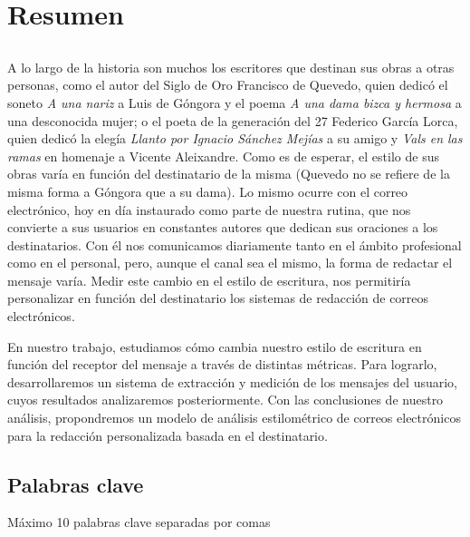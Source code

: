 \chapter*{Resumen}

\section*{\tituloPortadaVal}

A lo largo de la historia son muchos los escritores que destinan sus obras a otras personas, como el autor del Siglo de Oro Francisco de Quevedo, quien dedicó el soneto \textit{A una nariz} a Luis de Góngora y el poema \textit{A una dama bizca y hermosa} a una desconocida mujer; o el poeta de la generación del 27 Federico García Lorca, quien dedicó la elegía \textit{Llanto por Ignacio Sánchez Mejías} a su amigo y \textit{Vals en las ramas} en homenaje a Vicente Aleixandre. Como es de esperar, el estilo de sus obras varía en función del destinatario de la misma (Quevedo no se refiere de la misma forma a Góngora que a su dama). Lo mismo ocurre con el correo electrónico, hoy en día instaurado como parte de nuestra rutina, que nos convierte a sus usuarios en constantes autores que dedican sus oraciones a los destinatarios. Con él nos comunicamos diariamente tanto en el ámbito profesional como en el personal, pero, aunque el canal sea el mismo, la forma de redactar el mensaje varía. Medir este cambio en el estilo de escritura, nos permitiría personalizar en función del destinatario los sistemas de redacción de correos electrónicos.

En nuestro trabajo, estudiamos cómo cambia nuestro estilo de escritura en función del receptor del mensaje a través de distintas métricas. Para lograrlo, desarrollaremos un sistema de extracción y medición de los mensajes del usuario, cuyos resultados analizaremos posteriormente. Con las conclusiones de nuestro análisis, propondremos un modelo de análisis estilométrico de correos electrónicos para la redacción personalizada basada en el destinatario.

\section*{Palabras clave}
   
\noindent Máximo 10 palabras clave separadas por comas

   



